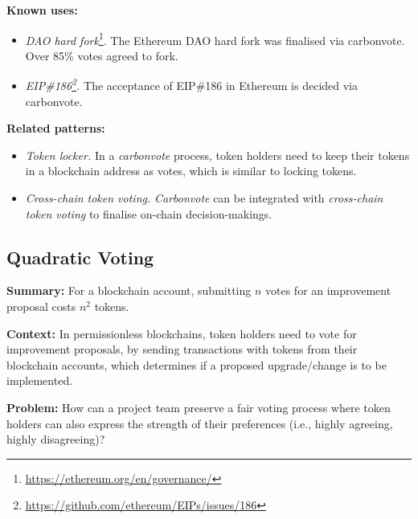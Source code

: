 \documentclass{article}
\begin{document}
\vspace{0.5em}\noindent \textbf{Known uses:}  
 \begin{itemize}
   \item \textit{DAO hard fork}\footnote{\url{https://ethereum.org/en/governance/}}. The Ethereum DAO hard fork was finalised via carbonvote. Over 85\% votes agreed to fork.
   
   \item \textit{EIP\#186\footnote{\url{https://github.com/ethereum/EIPs/issues/186}}.} The acceptance of EIP\#186 in Ethereum is decided via carbonvote.
 \end{itemize}
 
\vspace{0.5em}\noindent \textbf{Related patterns:} 

\begin{itemize}

    \item \textit{Token locker.} In a \textit{carbonvote} process, token holders need to keep their tokens in a blockchain address as votes, which is similar to locking tokens.
    
    \item \textit{Cross-chain token voting.} \textit{Carbonvote} can be integrated with \textit{cross-chain token voting} to finalise on-chain decision-makings.
    
\end{itemize}




\subsection{Quadratic Voting}

\vspace{0.5em}\noindent \textbf{Summary:} For a blockchain account, submitting $n$ votes for an improvement proposal costs $n^{2}$ tokens.



\vspace{0.5em}\noindent \textbf{Context:} In permissionless blockchains, token holders need to vote for improvement proposals, by sending transactions with tokens from their blockchain accounts, which determines if a proposed upgrade/change is to be implemented.

\vspace{0.5em}\noindent \textbf{Problem:} How can a project team preserve a fair voting process where token holders can also express the strength of their preferences (i.e., highly agreeing, highly disagreeing)?
\end{document}

